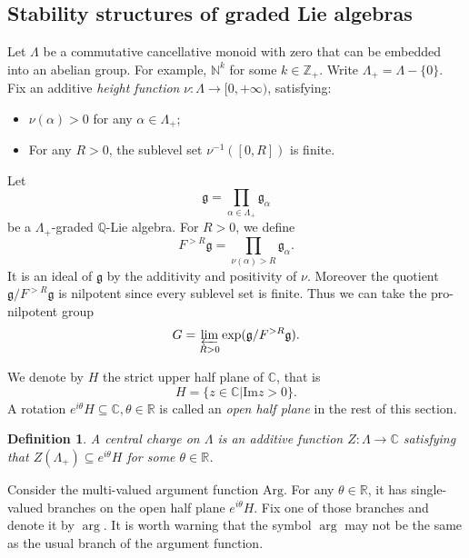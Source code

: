 \documentclass[a4paper,12pt]{amsart}
\numberwithin{equation}{section}
\newtheorem{definition}[theorem]{Definition}
\newcommand{\im}{\mathrm{Im}}
\newcommand{\1}{\mathbf{1}}
\newcommand{\Arg}{\mathrm{Arg}}
\begin{document}
\subsection{Stability structures of graded Lie algebras}
Let $\Lambda$ be a commutative cancellative monoid with zero that can be embedded into an abelian group. For example, $\mathbb{N}^k$ for some $k\in\mathbb{Z}_+$. Write $\Lambda_+=\Lambda-\{0\}$. Fix an additive \emph{height function} $\nu:\Lambda\rightarrow[0,+\infty)$, satisfying:
\begin{itemize}
    \item $\nu(\alpha)>0$ for any $\alpha\in\Lambda_+$;
    \item For any $R>0$, the sublevel set $\nu^{-1}([0,R])$ is finite.
\end{itemize}

Let
\[\mathfrak{g}=\prod_{\alpha\in\Lambda_+}\mathfrak{g}_\alpha\]
be a $\Lambda_+$-graded $\mathbb{Q}$-Lie algebra. For $R>0$, we define
\[F^{>R}\mathfrak{g}=\prod_{\nu(\alpha)>R}\mathfrak{g}_\alpha.\]
It is an ideal of $\mathfrak{g}$ by the additivity and positivity of $\nu$. Moreover the quotient $\mathfrak{g}/F^{>R}\mathfrak{g}$ is nilpotent since every sublevel set is finite. Thus we can take the pro-nilpotent group
\[G=\varprojlim_{R>0}\exp(\mathfrak{g}/F^{>R}\mathfrak{g}).\]

We denote by $H$ the strict upper half plane of $\mathbb{C}$, that is
\[H=\{z\in\mathbb{C}|\im z>0\}.\]
A rotation $e^{i\theta}H\subseteq\mathbb{C},\theta\in\mathbb{R}$ is called an \emph{open half plane} in the rest of this section.
\begin{definition}
    A \emph{central charge} on $\Lambda$ is an additive function $Z:\Lambda\rightarrow\mathbb{C}$ satisfying that $Z(\Lambda_+)\subseteq e^{i\theta}H$ for some $\theta\in\mathbb{R}$.
\end{definition}

Consider the multi-valued argument function $\Arg$. For any $\theta\in\mathbb{R}$, it has single-valued branches on the open half plane $e^{i\theta}H$. Fix one of those branches and denote it by $\arg$. It is worth warning that the symbol $\arg$ may not be the same as the usual branch of the argument function.
\end{document}
